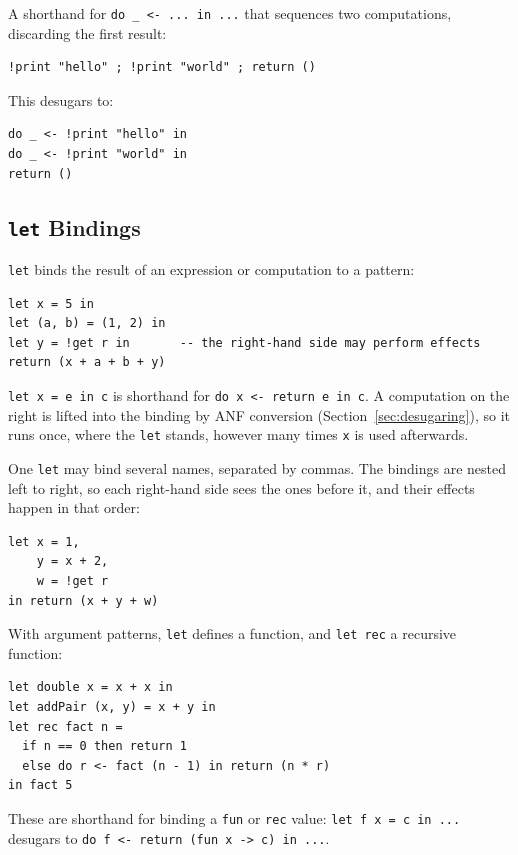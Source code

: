 \documentclass[11pt,a4paper]{article}
\newcommand{\cba}[1]{\lstinline[style=cbainline]{#1}}
\begin{document}
A shorthand for \cba{do _ <- ... in ...} that sequences two computations,
discarding the first result:

\begin{lstlisting}
!print "hello" ; !print "world" ; return ()
\end{lstlisting}

This desugars to:

\begin{lstlisting}
do _ <- !print "hello" in
do _ <- !print "world" in
return ()
\end{lstlisting}

\subsection{\texttt{let} Bindings}

\cba{let} binds the result of an expression or computation to a pattern:

\begin{lstlisting}
let x = 5 in
let (a, b) = (1, 2) in
let y = !get r in       -- the right-hand side may perform effects
return (x + a + b + y)
\end{lstlisting}

\cba{let x = e in c} is shorthand for \cba{do x <- return e in c}.  A
computation on the right is lifted into the binding by ANF conversion
(Section~\ref{sec:desugaring}), so it runs once, where the \cba{let} stands,
however many times \texttt{x} is used afterwards.

One \cba{let} may bind several names, separated by commas.  The bindings are
nested left to right, so each right-hand side sees the ones before it, and
their effects happen in that order:

\begin{lstlisting}
let x = 1,
    y = x + 2,
    w = !get r
in return (x + y + w)
\end{lstlisting}

With argument patterns, \cba{let} defines a function, and \cba{let rec} a
recursive function:

\begin{lstlisting}
let double x = x + x in
let addPair (x, y) = x + y in
let rec fact n =
  if n == 0 then return 1
  else do r <- fact (n - 1) in return (n * r)
in fact 5
\end{lstlisting}

These are shorthand for binding a \cba{fun} or \cba{rec} value:
\cba{let f x = c in ...} desugars to \cba{do f <- return (fun x -> c) in ...}.
\end{document}
